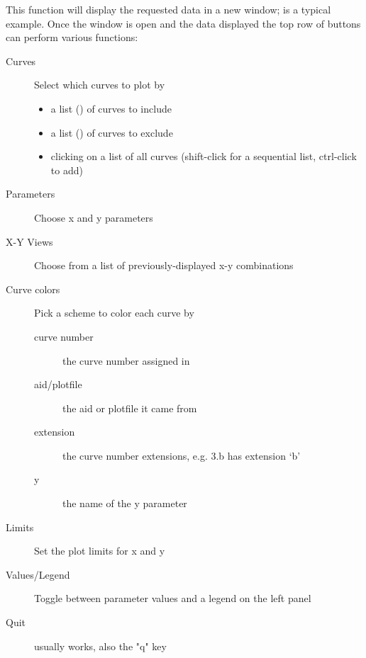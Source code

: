 \begin{subopts}
\end{subopts}
	
This function will display the requested data in a new
window;  is a typical example.
Once the window is open and the data displayed
the top row of buttons can perform various functions:
\begin{description}
	\item[Curves] Select which curves to plot by
		\begin{itemize}
			\item a list () of curves to include
			\item a list () of curves to exclude
			\item clicking on a list of all curves (shift-click for a
				sequential list, ctrl-click to add)
		\end{itemize}
	\item[Parameters] Choose x and y parameters
	\item[X-Y Views] Choose from a list of previously-displayed x-y combinations
	\item[Curve colors] Pick a scheme to color each curve by
		\begin{description}
			\item[curve number] the curve number assigned in 
			\item[aid/plotfile] the aid or plotfile it came from
			\item[extension] the curve number extensions, e.g. 3.b has extension `b'
			\item[y] the name of the y parameter
		\end{description}
	\item[Limits] Set the plot limits for x and y
	\item[Values/Legend] Toggle between parameter values and a legend on the
		left panel
	\item[Quit] usually works, also the "q" key
\end{description}

